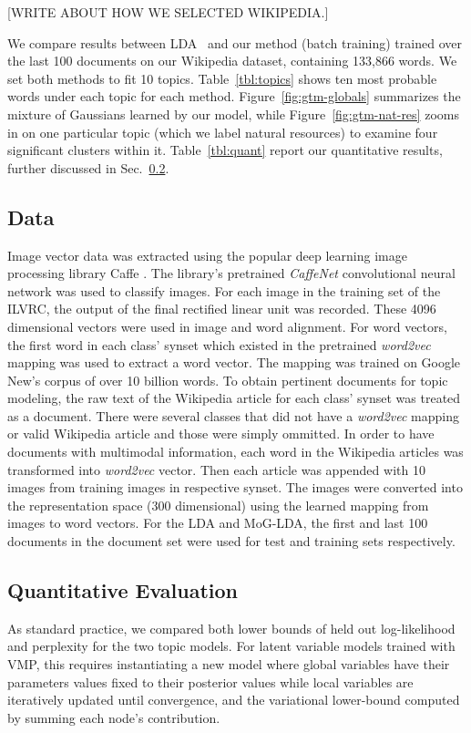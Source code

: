 \documentclass[11pt]{article}
\begin{document}
[WRITE ABOUT HOW WE SELECTED WIKIPEDIA.]

We compare results between LDA~\cite{Blei03} and our method (batch training) trained over the last 100 documents on our Wikipedia dataset, containing 133,866 words. We set both methods to fit 10 topics. Table~\ref{tbl:topics} shows ten most probable words under each topic for each method. Figure~\ref{fig:gtm-globals} summarizes the mixture of Gaussians learned by our model, while Figure~\ref{fig:gtm-nat-res} zooms in on one particular topic (which we label natural resources) to examine four significant clusters within it. Table~\ref{tbl:quant} report our quantitative results, further discussed in Sec.~\ref{sec:quant}.

\subsection{Data}
\label{sec:data}
Image vector data was extracted using the popular deep learning image processing library Caffe \cite{Jia14}. The library's pretrained \textit{CaffeNet} convolutional neural network was used to classify images. For each image in the training set of the ILVRC, the output of the final rectified linear unit was recorded. These 4096 dimensional vectors were used in image and word alignment. For word vectors, the first word in each class' synset which existed in the pretrained \textit{word2vec} \cite{Mikolov13a} mapping was used to extract a word vector. The mapping was trained on Google New's corpus of over 10 billion words. To obtain pertinent documents for topic modeling, the raw text of the Wikipedia article for each class' synset was treated as a document. There were several classes that did not have a \textit{word2vec} mapping or valid Wikipedia article and those were simply ommitted. In order to have documents with multimodal information, each word in the Wikipedia articles was transformed into \textit{word2vec} vector. Then each article was appended with 10 images from training images in respective synset. The images were converted into the representation space (300 dimensional) using the learned mapping from images to word vectors. For the LDA and MoG-LDA, the first and last 100 documents in the document set were used for test and training sets respectively.

\subsection{Quantitative Evaluation}
\label{sec:quant}
As standard practice, we compared both lower bounds of held out log-likelihood and perplexity for the two topic models. For latent variable models trained with VMP, this requires instantiating a new model where global variables have their parameters values fixed to their posterior values while local variables are iteratively updated until convergence, and the variational lower-bound computed by summing each node's contribution.
\end{document}
